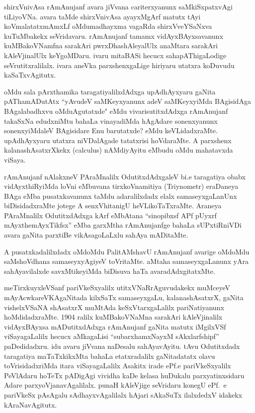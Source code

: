shirxVnivAsa rAmAnujanf avara jiVvana cariterxyanunx saMkiSxpatxvAgi tiLiyoVNa. avara taMde shirxVnivAsa ayayxMgArf matutx tAyi koVmalatatxmAmxLf oMdu\break madhayxma vagaRda shirxVveYSaNxva kuTuMbakekx seVridavaru. rAmAnujanf tamamx vidAyxBAyxsa\-vanunx kuMBa\-koVNamfna sarakAri pwrxDhashAleyalUlx anaMtara sarakAri kAleVjinalUlx keYgoMDaru. ivaru mitaBASi hecucx sahapAThigaLodige seVrutitxralilalx. ivara aneVka parxshenxgaLige hiriyaru utatxra koDuvudu kaSaTxvAgitutx.

oMdu sala pArxthamika taragatiyalilxdAdxga upAdhAyxyaru gaNita pATha\-mADutAtx ``yAvudeV saMKeyxyanunx adeV saMKeyxyiMda BAgisidAga BAgalabadhxvu oMdu\break Agutatxde" eMdu vivarisutitxdAdxga rAmAnujanf takaSxNa edudxniMtu bahaLa vinayadiMda hAgA\-dare sonenxyanunx sonenxyiMdaleV BAgisidare Enu barutatxde? eMdu keVLidadx\-raMte. upAdhAyxyaru utatxra niVDalAgade tatatxrisi hoVdaraMte. A parxshenx kalanashAsatxrXkekx {\rm (calculus)} nAMdiyAyitu eMbudu oMdu mahatavxda viSaya. 

rAmAnujanf nAlakxneV PAraMnalilx OdutitxdAdxgaleV bi.e taragatiya obabx vidAyxthiR\-yiMda loVni eMbuvana tirxkoVnamitiya {\rm (Triynometr)} eraDaneya BAga eMba pusatxkavanunx taMdu adaralilxdadx elalx samaseyxgaLanUnx biDisidadxraMte jotege A senxVhita\-nigU heVLikoTaTxraMte. Araneya PAraMnalilx OdutitxdAdxga kArf eMbAtana ``sinopibxsf APf pUyxrf mAyxthemAyxTikfsx'' eMba garxMtha rAmAnujanfge bahaLa sUPxtiRniVDi avara gaNita parxtiBe vikAsagoLaLxlu sahAya mADitaMte.

A pusatxkadalilxdadx oMdoMdu PalitAMshavU rAmAnujanf avarige oMdoMdu saMshoVdhana samaseyxyAgiyeV toVritaMte. aMtaha samaseyxgaLanunx yAra sahAya\-vilalxde savxMtikeyiMda biDisuva haTa avaradAdxgitatxMte.

meTirxkuyxleVSanf pariVkeSxyalilx utitxVNaRrAguvudakekx muMceyeV mAyAcwka\break reVKAgaNitada kilxSaTx samaseyxgaLu, kalanashAsatxrX, gaNita vishelxVSaNA shAsatxrX muMtAda keSxVtarxgaLalilx pariNatiyanunx hoMdidadxraMte. {\rm 1904} ralilx kuMBakoVNaMna sarakAri kAleVjinalilx vidAyxBAyxsa mADutitxdAdxga rAmAnujanf gaNita matutx iMgilxVSf viSayagaLalilx hecucx aMkagaLisi ``subarxhamxNayxM sAkxlarfshipf'' paDedidadxru. idu avaru jiVvana naDesalu sahAyavAyitu. tAvu Odutitxdadx taragatiya maTaTxkikxMta bahaLa etatxradalilx gaNita\-datatx olavu toVrisidadxriMda itara viSayagaLalilx Asakitx irade ePf.e pariVkeSxyalilx PeVlAdaru hoTeTx pADigAgi vividha kaDe kelasa huDukalu parxyatinxsidaru Adare parxyoV\-janavAgalilalx. punaH kAleVjige seVridaru konegU ePf.~e pariVkeSx pAsAgalu sAdhayxvAgalilalx hAjari sAkaSuTx ilalxdedxV idakekx kAraNavAgitutx.

